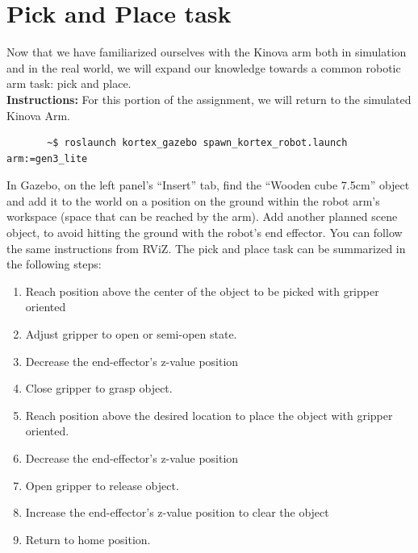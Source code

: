 \documentclass[12pt]{article}
\begin{document}
\section{Pick and Place task}

Now that we have familiarized ourselves with the Kinova arm both in simulation and in the real world, we will expand our knowledge towards a common robotic arm task: pick and place.\\


\textbf{Instructions:}
For this portion of the assignment, we will return to the simulated Kinova Arm.

    \begin{verbatim}
       ~$ roslaunch kortex_gazebo spawn_kortex_robot.launch arm:=gen3_lite
    \end{verbatim}

In Gazebo, on the left panel’s “Insert” tab, find the “Wooden cube 7.5cm” object and add it to the world on a position on the ground within the robot arm’s workspace (space that can be reached by the arm).
Add another planned scene object, to avoid hitting the ground with the robot’s end effector. You can follow the same instructions from RViZ.
The pick and place task can be summarized in the following steps:
\begin{enumerate}
    \item Reach position above the center of the object to be picked with gripper oriented
    \item Adjust gripper to open or semi-open state.
    \item Decrease the end-effector’s z-value position
    \item Close gripper to grasp object.
    \item Reach position above the desired location to place the object with gripper oriented.
    \item Decrease the end-effector’s z-value position
    \item Open gripper to release object.
    \item Increase the end-effector’s z-value position to clear the object
    \item Return to home position.
    
\end{enumerate}
\end{document}

